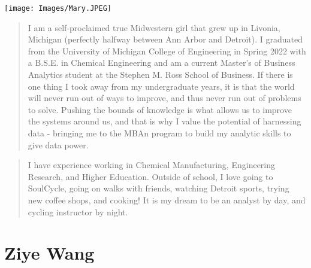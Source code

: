 \documentclass[
]{book}
\begin{document}
\texttt{[image: Images/Mary.JPEG]}

\begin{quote}
I am a self-proclaimed true Midwestern girl that grew up in Livonia, Michigan (perfectly halfway between Ann Arbor and Detroit). I graduated from the University of Michigan College of Engineering in Spring 2022 with a B.S.E. in Chemical Engineering and am a current Master's of Business Analytics student at the Stephen M. Ross School of Business. If there is one thing I took away from my undergraduate years, it is that the world will never run out of ways to improve, and thus never run out of problems to solve. Pushing the bounds of knowledge is what allows us to improve the systems around us, and that is why I value the potential of harnessing data - bringing me to the MBAn program to build my analytic skills to give data power.
\end{quote}

\begin{quote}
I have experience working in Chemical Manufacturing, Engineering Research, and Higher Education. Outside of school, I love going to SoulCycle, going on walks with friends, watching Detroit sports, trying new coffee shops, and cooking! It is my dream to be an analyst by day, and cycling instructor by night.
\end{quote}

\hypertarget{ziye-wang}{%
\section{Ziye Wang}\label{ziye-wang}}
\end{document}
